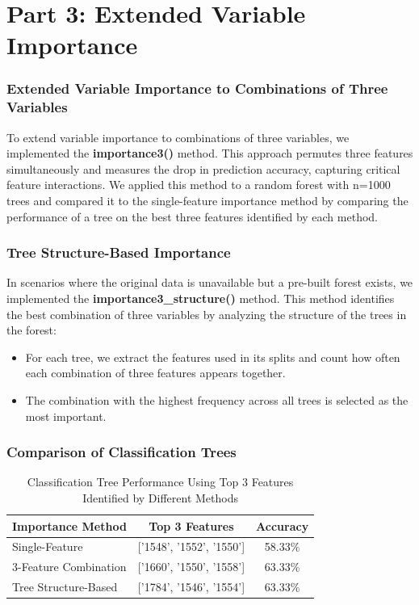 \documentclass[fleqn,moreauthors,10pt]{ds_report}
\begin{document}

\section*{Part 3: Extended Variable Importance}


\subsubsection*{Extended Variable Importance to Combinations of Three Variables}
To extend variable importance to combinations of three variables, we implemented the \textbf{importance3()} method. This approach permutes three features simultaneously and measures the drop in prediction accuracy, capturing critical feature interactions. We applied this method to a random forest with n=1000 trees and compared it to the single-feature importance method by comparing the performance of a tree on the best three features identified by each method.

\subsubsection*{Tree Structure-Based Importance}
In scenarios where the original data is unavailable but a pre-built forest exists, we implemented the \textbf{importance3\_structure()} method. This method identifies the best combination of three variables by analyzing the structure of the trees in the forest:
\begin{itemize}
    \item For each tree, we extract the features used in its splits and count how often each combination of three features appears together.
    \item The combination with the highest frequency across all trees is selected as the most important.
\end{itemize}

\subsubsection*{Comparison of Classification Trees}

\begin{table}[h!]
\centering
\caption{Classification Tree Performance Using Top 3 Features Identified by Different Methods}
\label{tab:feature_performance}
\begin{tabular}{|l|c|c|}
\hline
\textbf{Importance Method} & \textbf{Top 3 Features} & \textbf{Accuracy} \\ \hline
Single-Feature & ['1548', '1552', '1550'] & 58.33\% \\ \hline
3-Feature Combination & ['1660', '1550', '1558'] & 63.33\% \\ \hline
Tree Structure-Based & ['1784', '1546', '1554'] & 63.33\% \\ \hline
\end{tabular}
\end{table}
\end{document}

